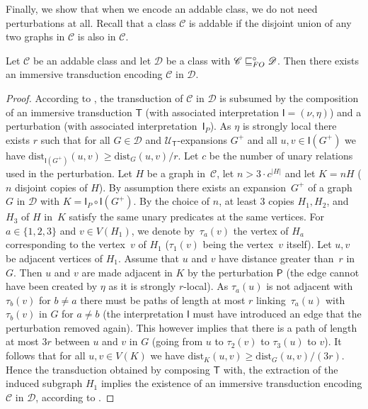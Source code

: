 \documentclass{lmcs}
\newcommand{\Cc}{\mathscr{C}}
\newcommand{\Dd}{\mathscr{D}}
\newcommand{\dist}{\mathrm{dist}}
\renewcommand{\FO}{{\rm FO}}
\theoremstyle{definition}
\begin{document}
Finally, we show that when we encode an addable class, we do not need perturbations at all. Recall that a class $\Cc$ is addable if the disjoint union of any two graphs in $\Cc$ is also in $\Cc$. 


\begin{lem}
	\label{lem:slunion}
	Let $\Cc$ be an addable  class and let $\Dd$ be a class with $\Cc\sqsubseteq_\FO^\circ\Dd$.  Then there exists an immersive transduction encoding $\Cc$ in $\Dd$.
\end{lem}
\begin{proof}
	According to , the transduction of $\Cc$ in $\Dd$ is subsumed by the composition of an immersive transduction $\mathsf T$ (with associated interpretation $\mathsf I=(\nu,\eta)$) and a perturbation (with associated interpretation~$\mathsf I_P$). As $\eta$ is strongly local there exists 
	$r$ such that for all $G\in \Dd$ and ${\mathcal U}_\mathsf{T}$-expansions 
	$G^+$ and all $u,v\in \mathsf{I}(G^+)$ we have $\dist_{\mathsf{I}(G^+)}(u,v)\geq
	\dist_G(u,v)/r$. 
	Let $c$ be the number of unary relations used in the perturbation. 
	Let $H$ be a graph in~$\Cc$, let $n>3\cdot c^{|H|}$ and let $K=nH$ ($n$ disjoint copies of $H$). By assumption there exists an expansion~$G^+$ of a graph~$G$ in $\Dd$ with $K=\mathsf I_P\circ\mathsf I(G^+)$. By the choice of $n$, at least $3$ copies $H_1,H_2$, and~$H_3$ of $H$ in~$K$ satisfy the same unary predicates at the same vertices. 
	For $a\in\{1,2,3\}$ and $v\in V(H_1)$, we denote by~$\tau_a(v)$ the vertex of $H_a$ corresponding to the vertex~$v$ of $H_1$ ($\tau_1(v)$ being the 
	vertex~$v$ itself).	 
	Let $u,v$ be adjacent vertices of $H_1$. Assume that $u$ and $v$
	have distance greater than~$r$ in $G$. Then $u$ and $v$ are made
	adjacent in $K$ by the perturbation $\mathsf{P}$ (the edge cannot have
	been created by $\eta$ as it is strongly $r$-local). As $\tau_a(u)$ is not
	adjacent with $\tau_b(v)$ for $b\neq a$ there must be paths of length
	at most $r$ linking~$\tau_a(u)$ with~$\tau_b(v)$ in $G$ for $a\neq b$ (the 
	interpretation $\mathsf{I}$ must have introduced an edge that the
	perturbation removed again). This however implies that there is a 
	path of length at most $3r$ between $u$ and $v$ in $G$ (going 
	from $u$ to $\tau_2(v)$ to $\tau_3(u)$ to $v$). It follows that for all 
	$u,v\in V(K)$ we have $\dist_K(u,v)\geq \dist_G(u,v)/(3r)$. 
	Hence the transduction obtained by composing $\mathsf T$ with, the extraction of the induced subgraph $H_1$ implies the existence of an immersive transduction encoding $\Cc$ in $\Dd$, according to . 
\end{proof}
\end{document}
